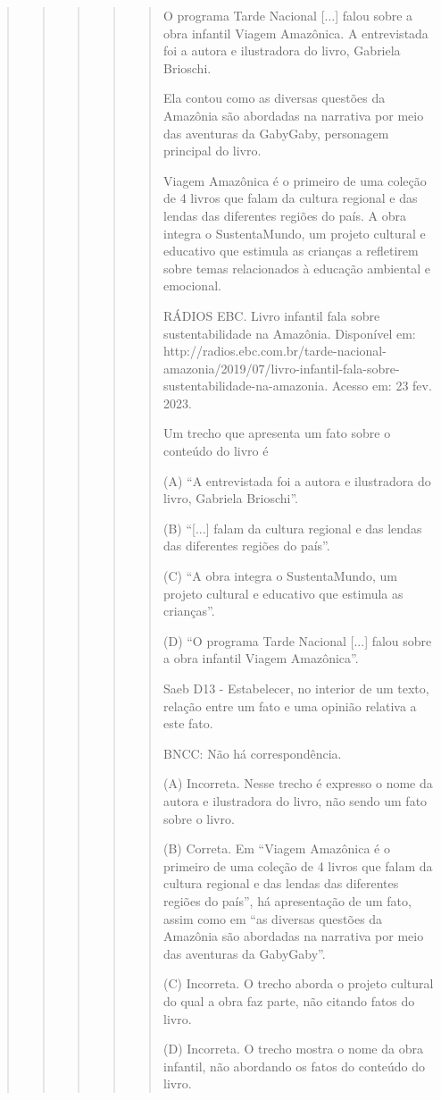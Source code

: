 \begin{quote}
\begin{quote}
\begin{quote}
\begin{quote}
\begin{quote}
O programa Tarde Nacional {[}...{]} falou sobre a obra infantil Viagem
Amazônica. A entrevistada foi a autora e ilustradora do livro, Gabriela
Brioschi.

Ela contou como as diversas questões da Amazônia são abordadas na
narrativa por meio das aventuras da GabyGaby, personagem principal do
livro.~

Viagem Amazônica é o primeiro de uma coleção de 4 livros que falam da
cultura regional e das lendas das diferentes regiões do país. A obra
integra o SustentaMundo, um projeto cultural e educativo que estimula as
crianças a refletirem sobre temas relacionados à educação ambiental e
emocional.

RÁDIOS EBC. Livro infantil fala sobre sustentabilidade na Amazônia.
Disponível em:
http://radios.ebc.com.br/tarde-nacional-amazonia/2019/07/livro-infantil-fala-sobre-sustentabilidade-na-amazonia.
Acesso em: 23 fev. 2023.

Um trecho que apresenta um fato sobre o conteúdo do livro é

(A) ``A entrevistada foi a autora e ilustradora do livro, Gabriela
Brioschi''.

(B) ``{[}...{]} falam da cultura regional e das lendas das diferentes
regiões do país''.

(C) ``A obra integra o SustentaMundo, um projeto cultural e educativo
que estimula as crianças''.

(D) ``O programa Tarde Nacional {[}...{]} falou sobre a obra infantil
Viagem Amazônica''.

Saeb D13 - Estabelecer, no interior de um texto, relação entre um fato e
uma opinião relativa a este fato.

BNCC: Não há correspondência.

(A) Incorreta. Nesse trecho é expresso o nome da autora e ilustradora do
livro, não sendo um fato sobre o livro.

(B) Correta. Em ``Viagem Amazônica é o primeiro de uma coleção de 4
livros que falam da cultura regional e das lendas das diferentes regiões
do país'', há apresentação de um fato, assim como em ``as diversas
questões da Amazônia são abordadas na narrativa por meio das aventuras
da GabyGaby''.

(C) Incorreta. O trecho aborda o projeto cultural do qual a obra faz
parte, não citando fatos do livro.

(D) Incorreta. O trecho mostra o nome da obra infantil, não abordando os
fatos do conteúdo do livro.
\end{quote}


\end{quote}
\end{quote}
\end{quote}
\end{quote}
